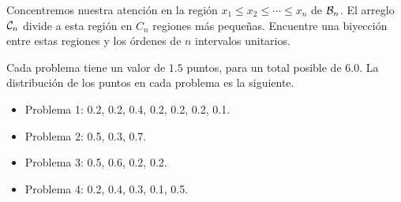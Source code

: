 \documentclass[letterpaper,10pt]{article}
\begin{document}
\begin{enumerate}
\begin{enumerate}
Concentremos nuestra atenci{\'o}n en la regi{\'o}n $x_1 \leq x_2
\leq \cdots \leq x_n$ de ${\cal B}_n$. El arreglo ${\cal C}_n$
divide a esta regi{\'o}n en $C_n$ regiones m{\'a}s peque{\~n}as.
Encuentre una biyecci{\'o}n entre estas regiones y los {\'o}rdenes
de $n$ intervalos unitarios.


\end{enumerate}


\end{enumerate}

\vspace{1cm}

\noindent Cada problema tiene un valor de $1.5$ puntos, para un
total posible de $6.0$. La distribuci{\'o}n de los puntos en cada
problema es la siguiente.

\begin{itemize}

\item Problema 1: 0.2, 0.2, 0.4, 0.2, 0.2, 0.2, 0.1.

\item Problema 2: 0.5, 0.3, 0.7.

\item Problema 3: 0.5, 0.6, 0.2, 0.2.

\item Problema 4: 0.2, 0.4, 0.3, 0.1, 0.5.

\end{itemize}

\end{document}
